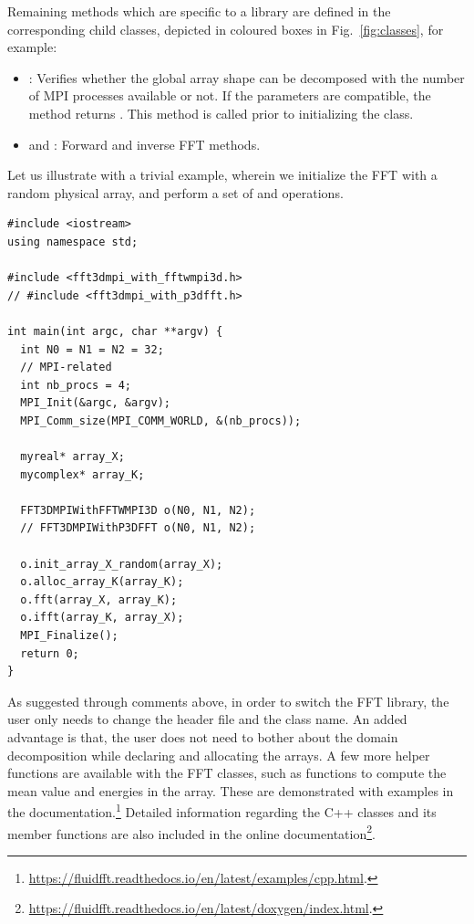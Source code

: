 Remaining methods which are specific to a library are defined in the
corresponding child classes, depicted in coloured boxes in
Fig.~\ref{fig:classes}, for example:

\begin{itemize}
  \item {}: Verifies whether the global array
    shape can be decomposed with the number of MPI processes available or not.
    If the parameters are compatible, the method returns .
    This method is called prior to initializing the class.
  \item {} and : Forward and inverse FFT
    methods.
\end{itemize}

Let us illustrate with a trivial example, wherein we initialize the FFT with a
random physical array, and perform a set of  and 
operations.
\begin{verbatim}
#include <iostream>
using namespace std;

#include <fft3dmpi_with_fftwmpi3d.h>
// #include <fft3dmpi_with_p3dfft.h>

int main(int argc, char **argv) {
  int N0 = N1 = N2 = 32;
  // MPI-related
  int nb_procs = 4;
  MPI_Init(&argc, &argv);
  MPI_Comm_size(MPI_COMM_WORLD, &(nb_procs));

  myreal* array_X;
  mycomplex* array_K;

  FFT3DMPIWithFFTWMPI3D o(N0, N1, N2);
  // FFT3DMPIWithP3DFFT o(N0, N1, N2);

  o.init_array_X_random(array_X);
  o.alloc_array_K(array_K);
  o.fft(array_X, array_K);
  o.ifft(array_K, array_X);
  MPI_Finalize();
  return 0;
}
\end{verbatim}

As suggested through comments above, in order to switch the FFT library, the
user only needs to change the header file and the class name. An added
advantage is that, the user does not need to bother about the domain
decomposition while declaring and allocating the arrays. A few more helper
functions are available with the FFT classes, such as functions to compute the
mean value and energies in the array. These are demonstrated with examples in
the documentation.\footnote{%
\url{https://fluidfft.readthedocs.io/en/latest/examples/cpp.html}.}
%
Detailed information regarding the C++ classes and its member functions are
also included in the online documentation\footnote{%
\url{https://fluidfft.readthedocs.io/en/latest/doxygen/index.html}.}.

